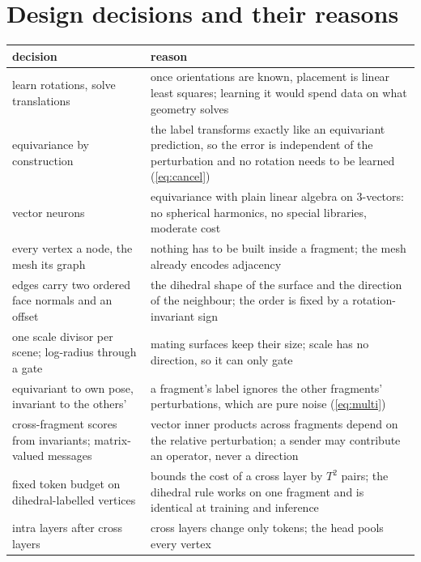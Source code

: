 \documentclass[11pt,a4paper]{article}
\theoremstyle{remark}
\begin{document}
\section{Design decisions and their reasons}
\label{sec:rationale}

\noindent\begin{minipage}{\linewidth}
\centering\small
{}
\label{tab:rationale}
\begin{tabularx}{\linewidth}{@{}>{\raggedright\arraybackslash}p{4.8cm}X@{}}
\toprule
decision & reason \\
\midrule
learn rotations, solve translations & once orientations are known, placement is linear least squares; learning it would spend data on what geometry solves \\
equivariance by construction & the label transforms exactly like an equivariant prediction, so the error is independent of the perturbation and no rotation needs to be learned (\cref{eq:cancel}) \\
vector neurons & equivariance with plain linear algebra on 3-vectors: no spherical harmonics, no special libraries, moderate cost \\
every vertex a node, the mesh its graph & nothing has to be built inside a fragment; the mesh already encodes adjacency \\
edges carry two ordered face normals and an offset & the dihedral shape of the surface and the direction of the neighbour; the order is fixed by a rotation-invariant sign \\
one scale divisor per scene; log-radius through a gate & mating surfaces keep their size; scale has no direction, so it can only gate \\
equivariant to own pose, invariant to the others' & a fragment's label ignores the other fragments' perturbations, which are pure noise (\cref{eq:multi}) \\
cross-fragment scores from invariants; matrix-valued messages & vector inner products across fragments depend on the relative perturbation; a sender may contribute an operator, never a direction \\
fixed token budget on dihedral-labelled vertices & bounds the cost of a cross layer by $T^2$ pairs; the dihedral rule works on one fragment and is identical at training and inference \\
intra layers after cross layers & cross layers change only tokens; the head pools every vertex \\

\end{tabularx}
\end{minipage}
\end{document}
